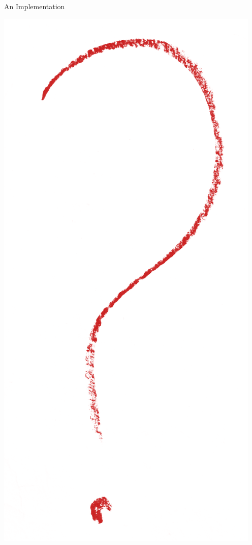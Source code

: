 \begin{frame}{An Implementation}
{\begin{minipage}{0.50\textwidth}
        \includegraphics[height=0.6\textheight]{data/flickr/questionmark-alertred}
    \end{minipage}
    }
\end{frame}
